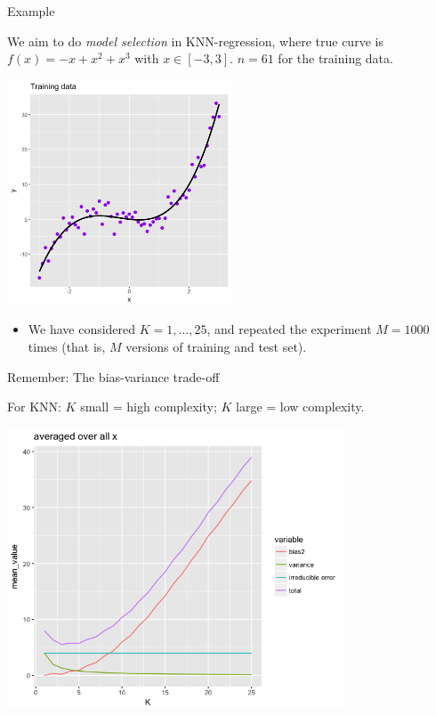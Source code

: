 \documentclass[
  10pt,
  ignorenonframetext,
]{beamer}
\providecommand{\tightlist}{%
  \setlength{\itemsep}{0pt}\setlength{\parskip}{0pt}}
\begin{document}
\begin{frame}
\begin{block}{Example}
\protect\hypertarget{example}{}
\vspace{2mm}

We aim to do \emph{model selection} in KNN-regression, where true curve
is \(f(x)=-x+x^2+x^3\) with \(x \in [-3,3]\). \(n=61\) for the training
data.

\vspace{4mm}

\centering

\includegraphics[width=0.5\textwidth,height=\textheight]{Prob1f1.png}

\begin{itemize}
\tightlist
\item
  We have considered \(K=1,\ldots,25\), and repeated the experiment
  \(M=1000\) times (that is, \(M\) versions of training and test set).
\end{itemize}
\end{block}
\end{frame}

\begin{frame}
\begin{block}{Remember: The bias-variance trade-off}
\protect\hypertarget{remember-the-bias-variance-trade-off}{}
\vspace{2mm}

For KNN: \(K\) small = high complexity; \(K\) large = low complexity.

\vspace{2mm}

\centering

\includegraphics[width=0.75\textwidth,height=\textheight]{Prob1f4.png}
\end{block}
\end{frame}
\end{document}
